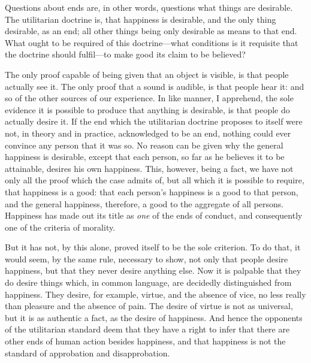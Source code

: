 \documentclass[12pt]{report}
\begin{document}
Questions about ends are, in other words, questions what things are desirable. The utilitarian doctrine is, that happiness is desirable, and the only thing desirable, as an end; all other things being only desirable as means to that end. What ought to be required of this doctrine—what conditions is it requisite that the doctrine should fulfil—to make good its claim to be believed?

The only proof capable of being given that an object is visible, is that people actually see it. The only proof that a sound is audible, is that people hear it: and so of the other sources of our experience. In like manner, I apprehend, the sole evidence it is possible to produce that anything is desirable, is that people do actually desire it. If the end which the utilitarian doctrine proposes to itself were not, in theory and in practice, acknowledged to be an end, nothing could ever convince any person that it was so. No reason can be given why the general happiness is desirable, except that each person, so far as he believes it to be attainable, desires his own happiness. This, however, being a fact, we have not only all the proof which the case admits of, but all which it is possible to require, that happiness is a good: that each person's happiness is a good to that person, and the general happiness, therefore, a good to the aggregate of all persons. Happiness has made out its title as \emph{one} of the ends of conduct, and consequently one of the criteria of morality.

But it has not, by this alone, proved itself to be the sole criterion. To do that, it would seem, by the same rule, necessary to show, not only that people desire happiness, but that they never desire anything else. Now it is palpable that they do desire things which, in common language, are decidedly distinguished from happiness. They desire, for example, virtue, and the absence of vice, no less really than pleasure and the absence of pain. The desire of virtue is not as universal, but it is as authentic a fact, as the desire of happiness. And hence the opponents of the utilitarian standard deem that they have a right to infer that there are other ends of human action besides happiness, and that happiness is not the standard of approbation and disapprobation.
\end{document}
